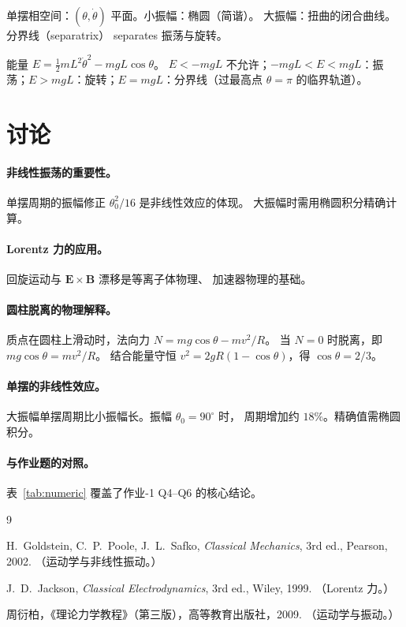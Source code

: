 \documentclass[UTF8,a4paper,11pt]{ctexart}
\begin{document}
单摆相空间：$(\theta,\dot\theta)$ 平面。小振幅：椭圆（简谐）。
大振幅：扭曲的闭合曲线。分界线（separatrix） separates 振荡与旋转。

能量 $E=\frac12 m L^2 \dot\theta^2 - mgL\cos\theta$。
$E<-mgL$ 不允许；$-mgL<E<mgL$：振荡；$E>mgL$：旋转；$E=mgL$：分界线（过最高点 $\theta=\pi$ 的临界轨道）。

\section{讨论}
\label{sec:discuss}

\paragraph{非线性振荡的重要性。}
单摆周期的振幅修正 $\theta_0^2/16$ 是非线性效应的体现。
大振幅时需用椭圆积分精确计算。

\paragraph{Lorentz 力的应用。}
回旋运动与 $\boldsymbol E\times\boldsymbol B$ 漂移是等离子体物理、
加速器物理的基础。

\paragraph{圆柱脱离的物理解释。}
质点在圆柱上滑动时，法向力 $N=mg\cos\theta-mv^2/R$。
当 $N=0$ 时脱离，即 $mg\cos\theta=mv^2/R$。
结合能量守恒 $v^2=2gR(1-\cos\theta)$，得 $\cos\theta=2/3$。

\paragraph{单摆的非线性效应。}
大振幅单摆周期比小振幅长。振幅 $\theta_0=90^\circ$ 时，
周期增加约 $18\%$。精确值需椭圆积分。

\paragraph{与作业题的对照。}
表~\ref{tab:numeric} 覆盖了作业-1 Q4--Q6 的核心结论。

\begin{thebibliography}{9}

H.~Goldstein, C.~P.~Poole, J.~L.~Safko,
\emph{Classical Mechanics}, 3rd ed., Pearson, 2002.
（运动学与非线性振动。）

J.~D.~Jackson, \emph{Classical Electrodynamics}, 3rd ed., Wiley, 1999.
（Lorentz 力。）

周衍柏，《理论力学教程》（第三版），高等教育出版社，2009.
（运动学与振动。）

\end{thebibliography}
\end{document}
